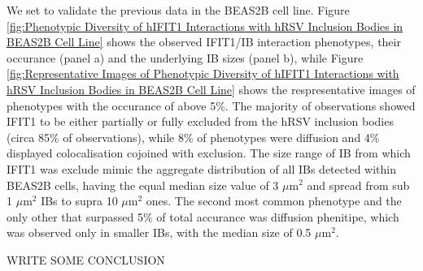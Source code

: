 We set to validate the previous data in the BEAS2B cell line. Figure \ref{fig:Phenotypic Diversity of hIFIT1 Interactions with hRSV Inclusion Bodies in BEAS2B Cell Line} shows the observed IFIT1/IB interaction phenotypes, their occurance (panel a) and the underlying IB sizes (panel b), while Figure \ref{fig:Representative Images of Phenotypic Diversity of hIFIT1 Interactions with hRSV Inclusion Bodies in BEAS2B Cell Line} shows the respresentative images of phenotypes with the occurance of above 5\%. The majority of observations showed IFIT1 to be either partially or fully excluded from the hRSV inclusion bodies (circa 85\% of observations), while 8\% of phenotypes were diffusion and 4\% displayed colocalisation cojoined with exclusion. The size range of IB from which IFIT1 was exclude mimic the aggregate distribution of all IBs detected within BEAS2B cells, having the equal median size value of 3 \(\mu \mbox{m}^2\) and spread from sub 1 \(\mu \mbox{m}^2\) IBs to supra 10 \(\mu \mbox{m}^2\) ones. The second most common phenotype and the only other that surpassed 5\% of total accurance was diffusion phenitipe, which was observed only in smaller IBs, with the median size of 0.5 \(\mu \mbox{m}^2\).

WRITE SOME CONCLUSION

